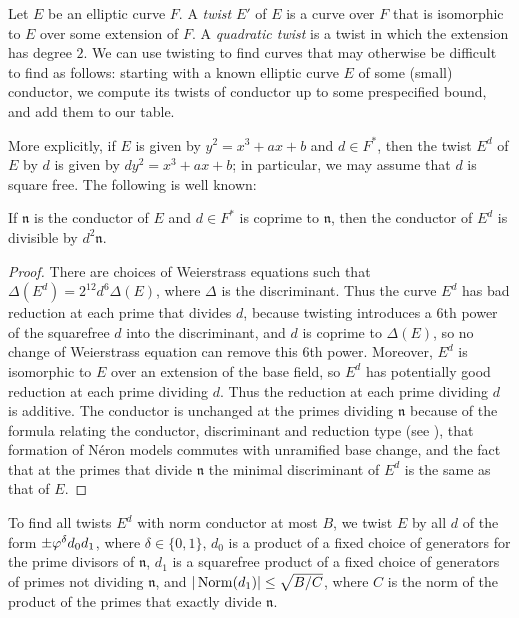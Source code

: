 \documentclass{amsart}
\newcommand{\n}{\mathfrak{n}}
\begin{document}
Let $E$ be an elliptic curve $F$. A \emph{twist} $E'$ of $E$ is a
curve over $F$ that is isomorphic to $E$ over some extension of $F$. A
\emph{quadratic twist} is a twist in which the extension has degree
$2$.  We can use twisting to find curves that may otherwise be
difficult to find as follows: starting with a known elliptic curve $E$
of some (small) conductor, we compute its twists of conductor up to
some prespecified bound, and add them to our table.

More explicitly, if $E$ is given by $y^2=x^3+ax+b$ and $d\in F^*$,
then the twist $E^d$ of $E$ by $d$ is given by $dy^2=x^3+ax+b$; in
particular, we may assume that $d$ is square free.  The following
is well known:
\begin{proposition}
If $\n$ is the
conductor of $E$ and $d \in F^*$ is coprime to $\n$, then the
conductor of $E^d$ is divisible by $d^2\n$.
\end{proposition}
\begin{proof}
There are choices of Weierstrass equations such that 
$\Delta(E^d) = 2^{12} d^6 \Delta(E)$, where $\Delta$
is the discriminant.
Thus the curve $E^d$ has bad reduction at each prime that divides $d$,
because twisting introduces a $6$th power of the squarefree $d$ into
the discriminant, and $d$ is coprime to $\Delta(E)$, so no change of
Weierstrass equation can remove this $6$th power.  Moreover, $E^d$ is
isomorphic to $E$ over an extension of the base field, so $E^d$ has
potentially good reduction at each prime dividing $d$.  Thus the
reduction at each prime dividing $d$ is additive.  The conductor is
unchanged at the primes dividing $\n$ because of the formula relating
the conductor, discriminant and reduction type (see \cite[App.~C,\S15]{silverman:aec}), that formation of
N\'eron models commutes with unramified base change, and the fact that
at the primes that divide $\n$ the minimal discriminant of $E^d$ is
the same as that of $E$.
\end{proof}
To find all twists $E^d$ with norm conductor at most $B$, we twist $E$
by all $d$ of the form $\pm \varphi^{\delta} d_0 d_1$, where $\delta\in
\{0,1\}$, $d_0$ is a product of a fixed choice of generators for
the prime divisors of $\n$, 
$d_1$ is a squarefree product of a fixed choice of generators of 
primes not dividing $\n$, and
$|\operatorname{Norm}(d_1)| \leq \sqrt{B/C}$, where $C$ is the norm of the product of
the primes that exactly divide $\n$.
\end{document}
